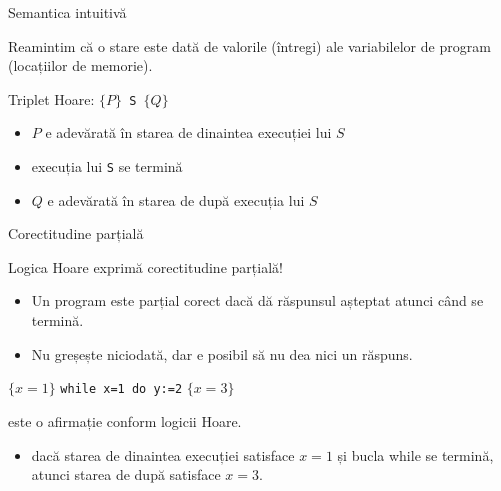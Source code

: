 \begin{frame}{Semantica intuitivă}

Reamintim că o \alert{stare} este dată de valorile (întregi) ale variabilelor de program (locațiilor de memorie).

\medskip \pause
\alert{Triplet Hoare:} $\{P\}$\texttt{ S }$\{Q\}$
\begin{itemize}
	\item {} $P$ e adevărată în starea de dinaintea execuției lui $S$
	\item {}  execuția lui \texttt{S} se termină
	\item {} $Q$ e adevărată în starea de după execuția lui $S$
\end{itemize}


\end{frame}

\begin{frame}{Corectitudine parțială}

Logica Hoare exprimă \alert{corectitudine parțială}!
\begin{itemize}
	\item Un program este \alert{parțial corect} dacă dă răspunsul așteptat atunci când se termină.
	\item Nu greșește niciodată, dar e posibil să nu dea nici un răspuns.
\end{itemize}

\medskip \pause
\begin{example}
\vspace{-.2cm}
\begin{center}
$\{x=1\}$ \texttt{while x=1 do y:=2} $\{x=3\}$
\end{center}
este o afirmație  conform logicii Hoare.
\begin{itemize}
	\item dacă starea de dinaintea execuției satisface $x=1$ \alert{și} bucla while se termină, atunci starea de după satisface $x=3$. 
\end{itemize}

\end{example}
\end{frame}


